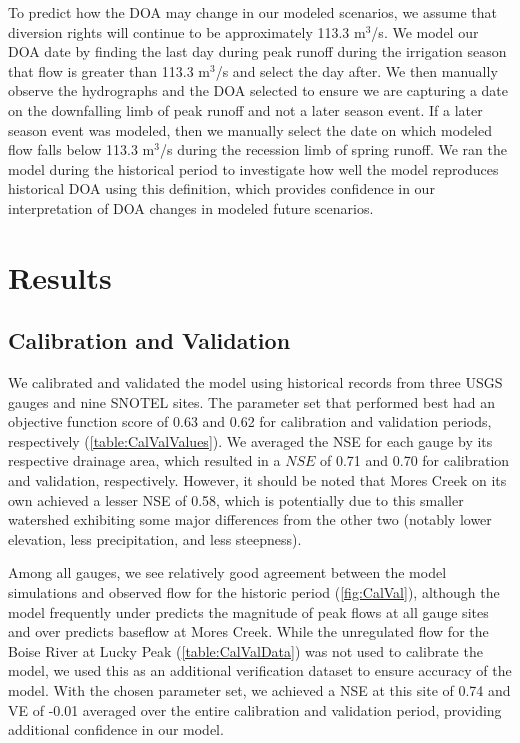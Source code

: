 \documentclass[water,article,submit,moreauthors,pdftex,10pt,a4paper]{mdpi}
\theoremstyle{mdpi}
\newcounter{ex}
\newcounter{re}
\theoremstyle{mdpidefinition}
\begin{document}
To predict how the DOA may change in our modeled scenarios, we assume that diversion rights will continue to be approximately 113.3 m${}^3$/s. We model our DOA date by finding the last day during peak runoff during the irrigation season that flow is greater than 113.3 m${}^3$/s and select the day after. We then manually observe the hydrographs and the DOA selected to ensure we are capturing a date on the downfalling limb of peak runoff and not a later season event. If a later season event was modeled, then we manually select the date on which modeled flow falls below 113.3 m${}^3$/s during the recession limb of spring runoff. We ran the model during the historical period to investigate how well the model reproduces historical DOA using this definition, which provides confidence in our interpretation of DOA changes in modeled future scenarios.

\section{Results}

\subsection{Calibration and Validation}
We calibrated and validated the model using historical records from three USGS gauges and nine SNOTEL sites. The parameter set that performed best had an objective function score of 0.63 and 0.62 for calibration and validation periods, respectively (\cref{table:CalValValues}). We averaged the NSE for each gauge by its respective drainage area, which resulted in a $NSE$ of 0.71 and 0.70 for calibration and validation, respectively. However, it should be noted that Mores Creek on its own achieved a lesser NSE of 0.58, which is potentially due to this smaller watershed exhibiting some major differences from the other two (notably lower elevation, less precipitation, and less steepness).

Among all gauges, we see relatively good agreement between the model simulations and observed flow for the historic period (\cref{fig:CalVal}), although the model frequently under predicts the magnitude of peak flows at all gauge sites and over predicts baseflow at Mores Creek. While the unregulated flow for the Boise River at Lucky Peak (\cref{table:CalValData}) was not used to calibrate the model, we used this as an additional verification dataset to ensure accuracy of the model. With the chosen parameter set, we achieved a NSE at this site of 0.74 and VE of -0.01 averaged over the entire calibration and validation period, providing additional confidence in our model.
\end{document}
